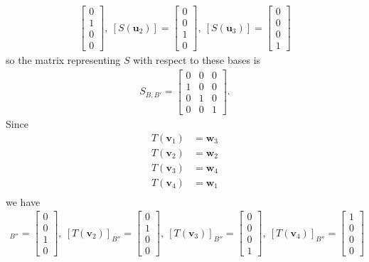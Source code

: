 \documentclass[12pt,letterpaper,reqno]{article}
\numberwithin{equation}{section}
\newcommand{\bv}{\mathbf{v}}
\newcommand{\bw}{\mathbf{w}}
\newcommand{\bu}{\mathbf{u}}
\begin{document}
\begin{example}
\begin{align*}
\begin{bmatrix}
		0 \\ 1 \\ 0 \\ 0
	\end{bmatrix}, \ [S(\bu_2)]=\begin{bmatrix}
		0 \\ 0 \\ 1 \\ 0
	\end{bmatrix}, \ [S(\bu_3)]=\begin{bmatrix}
		0 \\ 0 \\ 0 \\ 1
	\end{bmatrix}
\end{align*}
so the matrix representing $S$ with respect to these bases is 
\begin{align*}
	S_{B,B'}=\begin{bmatrix}
		0 & 0 & 0 \\
		1 & 0 & 0 \\
		0 & 1 & 0 \\
		0 & 0 & 1
	\end{bmatrix}.
\end{align*}
Since 
\begin{align*}
	T(\bv_1)&=\bw_3 \\
	T(\bv_2)&=\bw_2 \\
	T(\bv_3)&=\bw_4 \\
	T(\bv_4)&=\bw_1 \\
\end{align*}
we have 
\begin{align*}
	[T(\bv_1)]_{B''}=\begin{bmatrix}
		0 \\ 0 \\ 1 \\ 0
	\end{bmatrix}, \ [T(\bv_2)]_{B''}=\begin{bmatrix}
		0 \\ 1 \\ 0 \\ 0
	\end{bmatrix}, \ [T(\bv_3)]_{B''}=\begin{bmatrix}
		0 \\ 0 \\ 0 \\ 1
	\end{bmatrix}, \ [T(\bv_4)]_{B''}=\begin{bmatrix}
		1 \\ 0 \\ 0 \\ 0

\end{bmatrix}
\end{align*}
\end{example}
\end{document}
